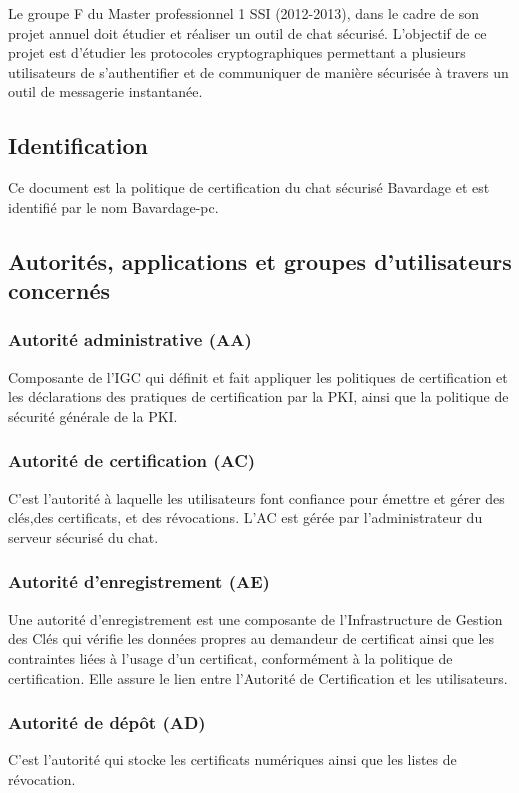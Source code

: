 \documentclass[a4paper,11pt,french]{article}
\begin{document}
Le groupe F du Master professionnel 1 SSI (2012-2013), dans le cadre de son projet annuel doit étudier et réaliser un outil de chat sécurisé. L'objectif de ce projet est d'étudier les protocoles cryptographiques permettant a plusieurs utilisateurs de s'authentifier et de communiquer de manière sécurisée à travers un outil de messagerie instantanée.


\subsection{ Identification }

Ce document est la politique de certification du chat sécurisé Bavardage et est identifié par le nom Bavardage-pc.


\subsection{ Autorités, applications et groupes d'utilisateurs concernés }
\subsubsection{Autorité administrative (AA)}

Composante de l'IGC qui définit et fait appliquer les politiques de certification et les déclarations des pratiques de certification par la PKI, ainsi que la politique de sécurité générale de la PKI.
	
\subsubsection{Autorité de certification (AC)}
C'est l'autorité à laquelle les utilisateurs font confiance pour émettre et gérer des clés,des certificats, et des révocations. L'AC est gérée par l'administrateur du serveur sécurisé du chat.


\subsubsection{Autorité d'enregistrement (AE)}

Une autorité d’enregistrement est une composante de l’Infrastructure de Gestion des Clés qui vérifie les données propres au demandeur de certificat ainsi que les contraintes liées à l’usage d’un certificat, conformément à la politique de certification. Elle assure le lien entre l'Autorité de Certification et les utilisateurs. 

\subsubsection{Autorité de dépôt (AD)}
C'est l'autorité qui stocke les certificats numériques ainsi que les listes de révocation.
\end{document}

